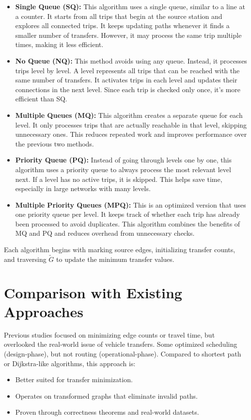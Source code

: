 \documentclass[11pt]{article}
\begin{document}
\begin{itemize}
    \item \textbf{Single Queue (SQ):} This algorithm uses a single queue, similar to a line at a counter. It starts from all trips that begin at the source station and explores all connected trips. It keeps updating paths whenever it finds a smaller number of transfers. However, it may process the same trip multiple times, making it less efficient.
    
    \item \textbf{No Queue (NQ):} This method avoids using any queue. Instead, it processes trips level by level. A level represents all trips that can be reached with the same number of transfers. It activates trips in each level and updates their connections in the next level. Since each trip is checked only once, it's more efficient than SQ.
    
    \item \textbf{Multiple Queues (MQ):} This algorithm creates a separate queue for each level. It only processes trips that are actually reachable in that level, skipping unnecessary ones. This reduces repeated work and improves performance over the previous two methods.
    
    \item \textbf{Priority Queue (PQ):} Instead of going through levels one by one, this algorithm uses a priority queue to always process the most relevant level next. If a level has no active trips, it is skipped. This helps save time, especially in large networks with many levels.
    
    \item \textbf{Multiple Priority Queues (MPQ):} This is an optimized version that uses one priority queue per level. It keeps track of whether each trip has already been processed to avoid duplicates. This algorithm combines the benefits of MQ and PQ and reduces overhead from unnecessary checks.
\end{itemize}

Each algorithm begins with marking source edges, initializing transfer counts, and traversing $\tilde{G}$ to update the minimum transfer values.

\section{Comparison with Existing Approaches}

Previous studies focused on minimizing edge counts or travel time, but overlooked the real-world issue of vehicle transfers. Some optimized scheduling (design-phase), but not routing (operational-phase). Compared to shortest path or Dijkstra-like algorithms, this approach is:
\begin{itemize}
    \item Better suited for transfer minimization.
    \item Operates on transformed graphs that eliminate invalid paths.
    \item Proven through correctness theorems and real-world datasets.
\end{itemize}
\end{document}
